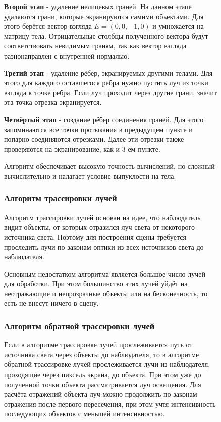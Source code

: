 \begin{figure}[h]
\textbf{Второй этап} - удаление нелицевых граней. На данном этапе удаляются грани, которые экранируются самими объектами. Для этого берётся вектор взгляда $E = (0, 0,-1, 0)$ и умножается на матрицу тела. Отрицательные столбцы полученного вектора будут соответствовать невидимым граням, так как вектор взгляда разнонаправлен с внутренней нормалью.

\textbf{Третий этап} - удаление рёбер, экранируемых другими телами. Для этого для каждого оставшегося ребра нужно пустить луч из точки взгляда к точке ребра. Если луч проходит через другие грани, значит эта точка отрезка экранируется. 

\textbf{Четвёртый этап} - создание рёбер соединения граней. Для этого запоминаются все точки протыкания в предыдущем пункте и попарно соединяются отрезками. Далее эти отрезки также проверяются на экранирование, как и 3-ем пункте.

Алгоритм обеспечивает высокую точность вычислений, но сложный вычислительно и налагает условие выпуклости на тела.


\subsubsection{Алгоритм трассировки лучей}

Алгоритм трассировки лучей основан на идее, что наблюдатель видит объекты, от которых отразился луч света от некоторого источника света. Поэтому для построения сцены требуется проследить лучи по законам оптики из всех источников света до наблюдателя.

Основным недостатком алгоритма является большое число лучей для обработки. При этом большинство этих лучей уйдёт на неотражающие и непрозрачные объекты или на бесконечность, то есть не внесут ничего в сцену.

\subsubsection{Алгоритм обратной трассировки лучей}
Если в алгоритме трассировке лучей прослеживается путь от источника света через объекты до наблюдателя, то в алгоритме обратной трассировке лучей прослеживается лучи из наблюдателя, проходящие через пиксель экрана, до объекта. При этом уже до полученной точки объекта рассматривается луч освещения. Для расчёта отражений объекта луч можно продолжить по законам отражения после первого пересечения, при этом учтя интенсивность последующих объектов с меньшей интенсивностью.


\end{figure}

